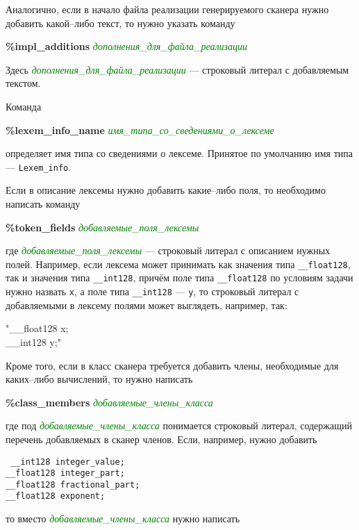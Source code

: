 \documentclass[10pt]{report}
\begin{document}
Аналогично, если в начало файла реализации генерируемого сканера нужно добавить какой--либо текст, то нужно указать команду

\noindent%
\textbf{\%impl_additions}  \textcolor{Green}{\textit{дополнения_для_файла_реализации}}

\noindent%
Здесь  \textcolor{Green}{\textit{дополнения_для_файла_реализации}} --- строковый литерал с добавляемым текстом.

Команда 

\noindent%
\textbf{\%lexem_info_name}  \textcolor{Green}{\textit{имя_типа_со_сведениями_о_лексеме}}

\noindent%
определяет имя типа со сведениями о лексеме. Принятое по умолчанию имя типа --- \texttt{Lexem_info}.


Если в описание лексемы нужно добавить какие--либо поля, то необходимо написать команду

\noindent%
\textbf{\%token_fields} \textcolor{Green}{\textit{добавляемые_поля_лексемы}}

\noindent где \textcolor{Green}{\textit{добавляемые_поля_лексемы}} --- строковый литерал с описанием нужных полей. Например, если лексема может принимать как значения типа
\texttt{__float128}, так и значения типа \texttt{__int128}, причём поле типа \texttt{__float128} по условиям задачи нужно назвать \texttt{x}, а поле типа  \texttt{__int128} ---
\texttt{y}, то строковый литерал с добавляемыми в лексему полями может выглядеть, например, так:

\noindent%
"__float128 x;\\
__int128    y;"

Кроме того, если в класс сканера требуется добавить члены, необходимые для каких--либо вычислений, то нужно написать

\noindent%
\textbf{\%class_members} \textcolor{Green}{\textit{добавляемые_члены_класса}}

\noindent %
где под \textcolor{Green}{\textit{добавляемые_члены_класса}} понимается строковый литерал, содержащий перечень добавляемых в сканер членов. Если, например, нужно добавить 

\noindent%
\texttt{%
__int128   integer_value;\\
__float128 integer_part;\\
__float128 fractional_part;\\
__float128 exponent;
}

\noindent то вместо \textcolor{Green}{\textit{добавляемые_члены_класса}} нужно написать
\end{document}
